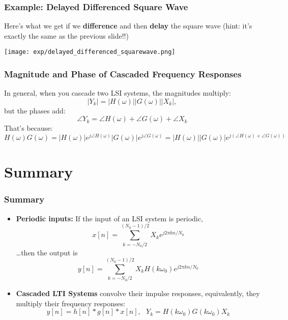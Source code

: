 \documentclass{beamer}
\begin{document}
\begin{frame}
  \frametitle{Example: Delayed Differenced Square Wave}

  \begin{center}
  \end{center}
  Here's what we get if we {\bf difference} and then {\bf delay} the square wave
  (hint: it's exactly the same as the previous slide!!)  
  \centerline{\texttt{[image: exp/delayed\_differenced\_squarewave.png]}}
\end{frame}

\begin{frame}
  \frametitle{Magnitude and Phase of Cascaded Frequency Responses}

  In general, when you cascade two LSI systems, the magnitudes multiply:
  \[
  |Y_k|=|H(\omega)||G(\omega)||X_k|,
  \]
  but the phases add:
  \[
  \angle Y_k = \angle H(\omega)+\angle G(\omega)+\angle X_k
  \]
  That's because:
  \[
  H(\omega)G(\omega)=|H(\omega)|e^{j\angle H(\omega)}|G(\omega)|e^{j\angle G(\omega)}
  =|H(\omega)||G(\omega)| e^{j\left(\angle H(\omega)+\angle G(\omega)\right)}
  \]
\end{frame}


\section[Summary]{Summary}
\setcounter{subsection}{1}

\begin{frame}
  \frametitle{Summary}
  \begin{itemize}
  \item {\bf Periodic inputs:}
    If the input of an LSI system is periodic,
    \[
    x[n] =\sum_{k=-N_0/2}^{(N_0-1)/2} X_k e^{j2\pi kn/N_0}
    \]
    \ldots then the output is
    \[
    y[n] = \sum_{k=-N_0/2}^{(N_0-1)/2} X_k H(k\omega_0) e^{j2\pi kn/N_0}
    \]
  \item {\bf Cascaded LTI Systems} convolve their impulse responses, equivalently, they
    multiply their frequency responses:
    \[
    y[n]=h[n]\ast g[n]\ast x[n],~~~Y_k=H(k\omega_0)G(k\omega_0)X_k
    \]
  \end{itemize}
\end{frame}
\end{document}
